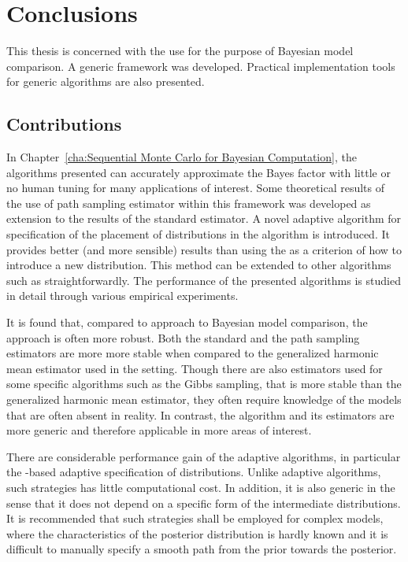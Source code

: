 \chapter{Conclusions}
\label{cha:Conclusions}

This thesis is concerned with the use \smc for the purpose of Bayesian model
comparison. A generic framework was developed. Practical implementation tools
for generic \smc algorithms are also presented.

\section{Contributions}
\label{sec:Contributions}

In Chapter~\ref{cha:Sequential Monte Carlo for Bayesian Computation}, the
algorithms presented can accurately approximate the Bayes factor with little
or no human tuning for many applications of interest. Some theoretical results
of the use of path sampling estimator within this framework was developed as
extension to the results of the standard estimator. A novel adaptive algorithm
for specification of the placement of distributions in the \smc[2] algorithm
is introduced. It provides better (and more sensible) results than using the
\ess as a criterion of how to introduce a new distribution. This method can be
extended to other algorithms such as \smc[3] straightforwardly. The
performance of the presented algorithms is studied in detail through various
empirical experiments.

It is found that, compared to \mcmc approach to Bayesian model comparison, the
\smc approach is often more robust. Both the standard and the path sampling
estimators are more more stable when compared to the generalized harmonic mean
estimator used in the \mcmc setting. Though there are also estimators used for
some specific \mcmc algorithms such as the Gibbs sampling, that is more stable
than the generalized harmonic mean estimator, they often require knowledge of
the models that are often absent in reality. In contrast, the \smc algorithm
and its estimators are more generic and therefore applicable in more areas of
interest.

There are considerable performance gain of the adaptive \smc algorithms, in
particular the \cess-based adaptive specification of distributions. Unlike
adaptive \mcmc algorithms, such strategies has little computational cost. In
addition, it is also generic in the sense that it does not depend on a
specific form of the intermediate distributions. It is recommended that such
strategies shall be employed for complex models, where the characteristics of
the posterior distribution is hardly known and it is difficult to manually
specify a smooth path from the prior towards the posterior.

